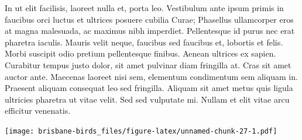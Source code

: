 \documentclass[]{book}
\let\origfigure\figure
\let\endorigfigure\endfigure
\renewenvironment{figure}[1][2] {
  \expandafter\origfigure\expandafter[H]
} {
  \endorigfigure
}
\begin{document}
In ut elit facilisis, laoreet nulla et, porta leo. Vestibulum ante ipsum
primis in faucibus orci luctus et ultrices posuere cubilia Curae;
Phasellus ullamcorper eros at magna malesuada, ac maximus nibh
imperdiet. Pellentesque id purus nec erat pharetra iaculis. Mauris velit
neque, faucibus sed faucibus et, lobortis et felis. Morbi suscipit odio
pretium pellentesque finibus. Aenean ultrices ex sapien. Curabitur
tempus justo dolor, sit amet pulvinar diam fringilla at. Cras sit amet
auctor ante. Maecenas laoreet nisi sem, elementum condimentum sem
aliquam in. Praesent aliquam consequat leo sed fringilla. Aliquam sit
amet metus quis ligula ultricies pharetra ut vitae velit. Sed sed
vulputate mi. Nullam et elit vitae arcu efficitur venenatis.

\begin{figure}
\centering
\texttt{[image: brisbane-birds\_files/figure-latex/unnamed-chunk-27-1.pdf]}
\caption{\label{fig:unnamed-chunk-27}insert figure caption}
\end{figure}
\end{document}

